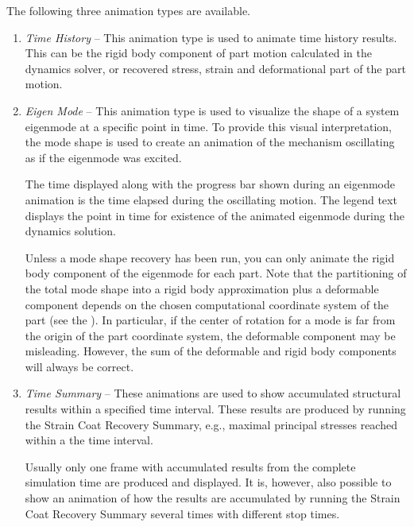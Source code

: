 
The following three animation types are available.

\begin{enumerate}
\item{\sl Time History} --
  This animation type is used to animate time history results.
  This can be the rigid body component of part motion calculated in the dynamics
  solver, or recovered stress, strain and deformational part of the part motion.

\item{\sl Eigen Mode} --
  This animation type is used to visualize the shape of a system eigenmode at
  a specific point in time. To provide this visual interpretation, the mode
  shape is used to create an animation of the mechanism oscillating as if the
  eigenmode was excited.

  The time displayed along with the progress bar shown during an eigenmode
  animation is the time elapsed during the oscillating motion. The legend text
  displays the point in time for existence of the animated eigenmode during the
  dynamics solution.

  Unless a mode shape recovery has been run, you can only animate the rigid body
  component of the eigenmode for each part. Note that the partitioning of the
  total mode shape into a rigid body approximation plus a deformable component
  depends on the chosen computational coordinate system of the part
  (see the ).
  In particular, if the center of rotation for a mode is far from the origin of
  the part coordinate system, the deformable component may be misleading.
  However, the sum of the deformable and rigid body components will always be
  correct.

\item{\sl Time Summary} --
  These animations are used to show accumulated structural results within
  a specified time interval. These results are produced by running the Strain
  Coat Recovery Summary, e.g., maximal principal stresses reached within a
  the time interval.

  Usually only one frame with accumulated results from the complete simulation
  time are produced and displayed. It is, however, also possible to show an
  animation of how the results are accumulated by running the Strain Coat
  Recovery Summary several times with different stop times.
\end{enumerate}

